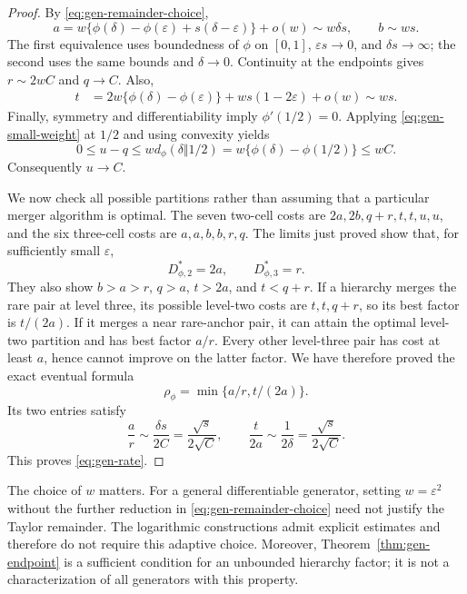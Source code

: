 \begin{proof}
By \eqref{eq:gen-remainder-choice},
\[
 a=w\{\phi(\delta)-\phi(\varepsilon)
                  +s(\delta-\varepsilon)\}+o(w)
       \sim w\delta s,
 \qquad b\sim ws.
\]
The first equivalence uses boundedness of $\phi$ on $[0,1]$,
$\varepsilon s\to0$, and $\delta s\to\infty$; the second uses
the same bounds and $\delta\to0$. Continuity at the endpoints
gives $r\sim2wC$ and $q\to C$. Also,
\begin{align*}
 t
 &=2w\{\phi(\delta)-\phi(\varepsilon)\}
          +ws(1-2\varepsilon)+o(w)
   \sim ws.
\end{align*}
Finally, symmetry and differentiability imply $\phi'(1/2)=0$.
Applying \eqref{eq:gen-small-weight} at $1/2$ and using convexity
yields
\[
 0\le u-q\le wd_\phi(\delta\Vert1/2)
       =w\{\phi(\delta)-\phi(1/2)\}\le wC.
\]
Consequently $u\to C$.

We now check all possible partitions rather than assuming that a
particular merger algorithm is optimal. The seven two-cell costs
are $2a,2b,q+r,t,t,u,u$, and the six three-cell costs are
$a,a,b,b,r,q$. The limits just proved show that, for sufficiently
small $\varepsilon$,
\[
 D_{\phi,2}^*=2a,\qquad D_{\phi,3}^*=r.
\]
They also show $b>a>r$, $q>a$, $t>2a$, and $t<q+r$.
If a hierarchy merges the rare pair at level three, its possible
level-two costs are $t,t,q+r$, so its best factor is $t/(2a)$.
If it merges a near rare-anchor pair, it can attain the optimal
level-two partition and has best factor $a/r$. Every other
level-three pair has cost at least $a$, hence cannot improve on
the latter factor. We have therefore proved the exact eventual
formula
\[
 \rho_\phi=\min\{a/r,t/(2a)\}.
\]
Its two entries satisfy
\[
 \frac a r\sim\frac{\delta s}{2C}
            =\frac{\sqrt s}{2\sqrt C},
 \qquad
 \frac{t}{2a}\sim\frac1{2\delta}
            =\frac{\sqrt s}{2\sqrt C}.
\]
This proves \eqref{eq:gen-rate}.
\end{proof}

The choice of $w$ matters. For a general differentiable generator,
setting $w=\varepsilon^2$ without the further reduction in
\eqref{eq:gen-remainder-choice} need not justify the Taylor
remainder. The logarithmic constructions admit explicit estimates
and therefore do not require this adaptive choice. Moreover,
Theorem~\ref{thm:gen-endpoint} is a sufficient condition for an
unbounded hierarchy factor; it is not a characterization of all
generators with this property.

